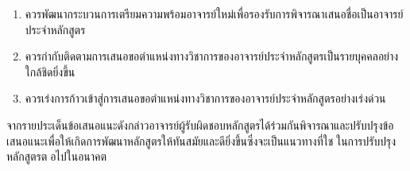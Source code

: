 \begin{enumerate}
	\item ควรพัฒนากระบวนการเตรียมความพร้อมอาจารย์ใหม่เพื่อรองรับการพิจารณาเสนอชื่อเป็นอาจารย์ประจำหลักสูตร 
    \item ควรกำกับติดตามการเสนอขอตำแหน่งทางวิชาการของอาจารย์ประจำหลักสูตรเป็นรายบุคคลอย่าง
     ใกล้ชิดยิ่งขึ้น
      \item ควรเร่งการก้าวเข้าสู่การเสนอขอตำแหน่งทางวิชาการของอาจารย์ประจำหลักสูตรอย่างเร่งด่วน
\end{enumerate}
จากรายประเด็นข้อเสนอแนะดังกล่าวอาจารย์ผู้รับผิดชอบหลักสูตรได้ร่วมกันพิจารณาและปรับปรุงข้อเสนอแนะเพื่อให้เกิดการพัฒนาหลักสูตรให้ทันสมัยและดียิ่งขึ้นซึ่งจะเป็นแนวทางที่ใชในการปรับปรุง
หลักสูตรตอไปในอนาคต



\begin{doclist}
\end{doclist}


